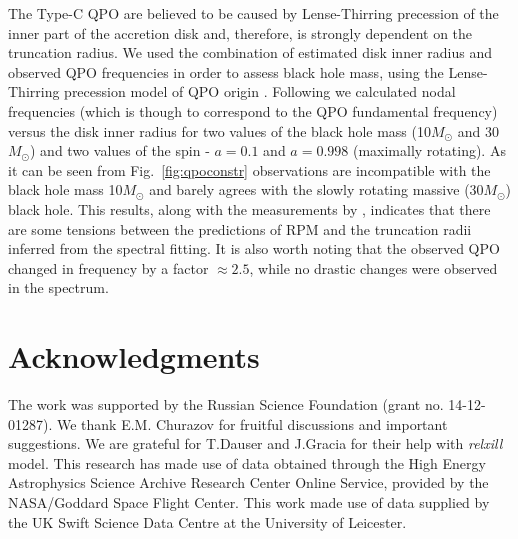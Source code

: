 \documentclass[a4paper,fleqn,usenatbib]{mnras}
\begin{document}
The Type-C QPO are believed to be caused by Lense-Thirring precession of the inner part of the accretion disk and, therefore, is strongly dependent on the truncation radius.
We used the combination of estimated disk inner radius and observed QPO frequencies in order to assess black hole mass, using the Lense-Thirring precession model of QPO origin \citep{ingram09}.
Following \citet{ingram14} we calculated nodal frequencies (which is though to correspond to the QPO fundamental frequency) versus the disk inner radius for two values of the black hole mass (10$M_{\odot}$ and 30$M_{\odot}$) and two values of the spin - $a=0.1$ and $a=0.998$ (maximally rotating). 
As it can be seen from Fig.~\ref{fig:qpoconstr} observations are incompatible with the black hole mass 10$M_{\odot}$ and barely agrees with the slowly rotating massive (30$M_{\odot}$) black hole. 
This results, along with the measurements by \cite{fuerst16_gx339, mereminskiy18_maxi}, indicates that there are some tensions between the predictions of RPM and the truncation radii inferred from the spectral fitting. It is also worth noting that the observed QPO changed in frequency by a factor $\approx2.5$, while no drastic changes were observed in the spectrum. 


\section*{Acknowledgments}
The work was supported by the Russian Science Foundation (grant no. 14-12-01287). 
We thank E.M. Churazov for fruitful discussions and important suggestions. 
We are grateful for T.Dauser and J.Gracia for their help with {\em relxill} model. 
This research has made use of data obtained through the High Energy Astrophysics Science Archive Research Center Online Service, provided by the NASA/Goddard Space Flight Center.
This work made use of data supplied by the UK Swift Science Data Centre at the University of Leicester.



\bsp	
\label{lastpage}
\end{document}
